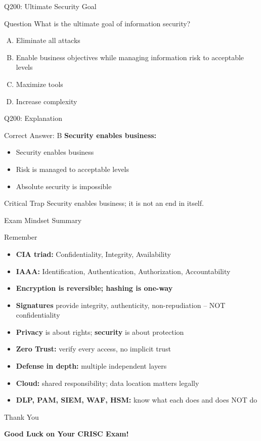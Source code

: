 \documentclass{beamer}
\begin{document}
	\begin{frame}{Q200: Ultimate Security Goal}
		\begin{block}{Question}
			What is the ultimate goal of information security?
		\end{block}
		\begin{enumerate}[(A)]
			\item Eliminate all attacks
			\item Enable business objectives while managing information risk to acceptable levels
			\item Maximize tools
			\item Increase complexity
		\end{enumerate}
	\end{frame}
	
	\begin{frame}{Q200: Explanation}
		\begin{block}{Correct Answer: B}
			\textbf{Security enables business:}
			\begin{itemize}
				\item Security enables business
				\item Risk is managed to acceptable levels
				\item Absolute security is impossible
			\end{itemize}
		\end{block}
		\begin{alertblock}{Critical Trap}
			Security enables business; it is not an end in itself.
		\end{alertblock}
	\end{frame}
	
	\begin{frame}{Exam Mindset Summary}
		\begin{block}{Remember}
			\begin{itemize}
				\item \textbf{CIA triad:} Confidentiality, Integrity, Availability
				\item \textbf{IAAA:} Identification, Authentication, Authorization, Accountability
				\item \textbf{Encryption is reversible; hashing is one-way}
				\item \textbf{Signatures} provide integrity, authenticity, non-repudiation -- NOT confidentiality
				\item \textbf{Privacy} is about rights; \textbf{security} is about protection
				\item \textbf{Zero Trust:} verify every access, no implicit trust
				\item \textbf{Defense in depth:} multiple independent layers
				\item \textbf{Cloud:} shared responsibility; data location matters legally
				\item \textbf{DLP, PAM, SIEM, WAF, HSM:} know what each does and does NOT do
			\end{itemize}
		\end{block}
	\end{frame}
	
	\begin{frame}{Thank You}
		\begin{center}
			{\Huge \textbf{Good Luck on Your CRISC Exam!}}
		\end{center}
	\end{frame}
	
\end{document}
